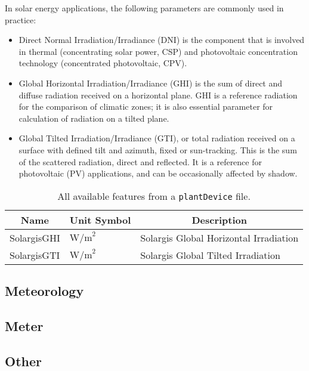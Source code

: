 In solar energy applications, the following parameters are commonly used in
practice:

\begin{itemize}
	\item Direct Normal Irradiation/Irradiance (DNI) is the component that is
	      involved in thermal (concentrating solar power, CSP) and photovoltaic
	      concentration
	      technology (concentrated photovoltaic, CPV).
	\item  Global Horizontal
	      Irradiation/Irradiance (GHI) is the sum of direct and diffuse radiation
	      received on a horizontal plane. GHI is a reference radiation for the
	      comparison of climatic zones; it is also essential parameter for
	      calculation of radiation on a tilted plane.
	\item Global Tilted Irradiation/Irradiance (GTI), or total
	      radiation received on a surface with defined tilt and azimuth, fixed or
	      sun-tracking. This is the sum of the scattered radiation, direct and
	      reflected. It is a reference for photovoltaic (PV) applications, and
	      can be occasionally affected by shadow.
\end{itemize}


\begin{table}[H]
	\begin{center}
		\begin{tabular}[c]{l|l|l}
			\hline
			\multicolumn{1}{c|}{\textbf{Name}}        &
			\multicolumn{1}{c|}{\textbf{Unit Symbol}} &
			\multicolumn{1}{c}{\textbf{Description}}                                                            \\
			\hline
			SolargisGHI                               & $\text{W/m}^2$ & Solargis Global Horizontal Irradiation \\
			SolargisGTI                               & $\text{W/m}^2$ & Solargis Global Tilted Irradiation     \\
			\hline
		\end{tabular}
		\caption{All available features from a \texttt{plantDevice} file.}\label{tab:solargisfeatures}
	\end{center}
\end{table}

\subsection{Meteorology}

\subsection{Meter}

\subsection{Other}